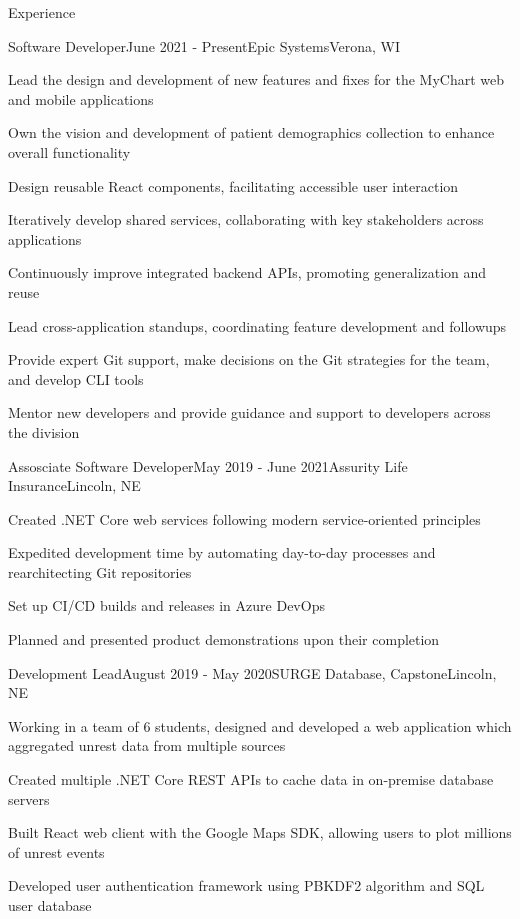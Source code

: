 \documentclass[
	10pt, %
]{article} %
\begin{document}
\begin{rSection}{Experience}

	\begin{rSubsection}{Software Developer}{June 2021 - Present}{Epic Systems}{Verona, WI}
		\item Lead the design and development of new features and fixes for the MyChart web and mobile applications
		\item Own the vision and development of patient demographics collection to enhance overall functionality
		\item Design reusable React components, facilitating accessible user interaction
		\item Iteratively develop shared services, collaborating with key stakeholders across applications
		\item Continuously improve integrated backend APIs, promoting generalization and reuse
		\item Lead cross-application standups, coordinating feature development and followups
		\item Provide expert Git support, make decisions on the Git strategies for the team, and develop CLI tools
		\item Mentor new developers and provide guidance and support to developers across the division
	\end{rSubsection}

	\begin{rSubsection}{Assosciate Software Developer}{May 2019 - June 2021}{Assurity Life Insurance}{Lincoln, NE}
		\item Created .NET Core web services following modern service-oriented principles
		\item Expedited development time by automating day-to-day processes and rearchitecting Git repositories
		\item Set up CI/CD builds and releases in Azure DevOps
		\item Planned and presented product demonstrations upon their completion
	\end{rSubsection}

	\begin{rSubsection}{Development Lead}{August 2019 - May 2020}{SURGE Database, Capstone}{Lincoln, NE}
		\item Working in a team of 6 students, designed and developed a web application which aggregated unrest data from multiple sources
		\item Created multiple .NET Core REST APIs to cache data in on-premise database servers
		\item Built React web client with the Google Maps SDK, allowing users to plot millions of unrest events
		\item Developed user authentication framework using PBKDF2 algorithm and SQL user database
	\end{rSubsection}


\end{rSection}
\end{document}
